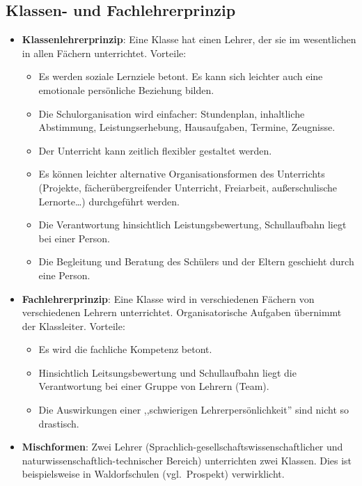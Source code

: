 \subsection{Klassen- und Fachlehrerprinzip}
\begin{itemize}
\item \textbf{Klassenlehrerprinzip}: Eine Klasse hat einen Lehrer, der
sie im wesentlichen in allen F\"{a}chern unterrichtet.
Vorteile:
\begin{itemize}
\item Es werden soziale Lernziele betont.
Es kann sich leichter auch eine emotionale pers\"{o}nliche
Beziehung bilden.
\item Die Schulorganisation wird einfacher: Stundenplan, inhaltliche
Abstimmung, Leistungserhebung, Hausaufgaben, Termine, Zeugnisse.
\item Der Unterricht kann zeitlich flexibler gestaltet werden.
\item Es k\"{o}nnen leichter alternative Organisationsformen des
Unterrichts (Projekte, f\"{a}\-cher\-\"{u}ber\-grei\-fen\-der Unterricht,
Freiarbeit, au{\ss}erschulische Lernorte\dots) durchgef\"{u}hrt werden.
\item Die Verantwortung hinsichtlich Leistungsbewertung,
Schullaufbahn liegt bei einer Person.
\item Die Begleitung und Beratung des Sch\"{u}lers und der
Eltern geschieht durch eine Person.
\end{itemize}

\item \textbf{Fachlehrerprinzip}:
Eine Klasse wird in verschiedenen F\"{a}chern von
verschiedenen Lehrern unterrichtet.
Organisatorische Aufgaben \"{u}bernimmt der Klassleiter.
Vorteile:
\begin{itemize}
\item Es wird die fachliche Kompetenz betont.
\item Hinsichtlich Leitsungsbewertung und Schullaufbahn liegt die
Verantwortung bei einer Gruppe von Lehrern (Team).
\item Die Auswirkungen einer
,,schwierigen Lehrerpers\"{o}nlichkeit'' sind nicht so drastisch.
\end{itemize}

\item \textbf{Mischformen}: Zwei Lehrer
(Sprachlich-gesellschaftswissenschaftlicher
und natur\-wis\-sen\-schaft\-lich-technischer Bereich)
unterrichten zwei Klassen.
Dies ist beispielsweise in Waldorfschulen (vgl.\ Prospekt)
verwirklicht.
\end{itemize}


